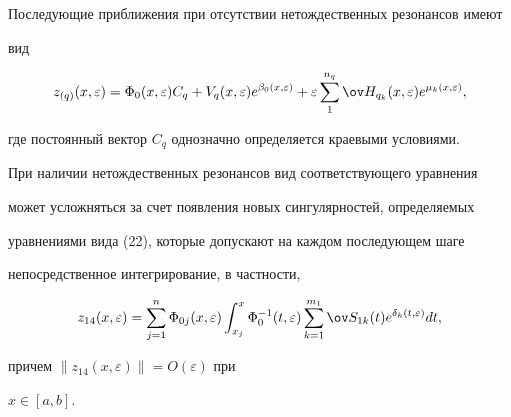 Последующие приближения при отсутствии нетождественных резонансов имеют 


вид 


$$ 


z_{(q)}(x,\varepsilon)=\Phi_0(x,\varepsilon)C_q+ 


V_q(x,\varepsilon)e^{\beta_0(x,\varepsilon)}+\varepsilon 


\sum^{n_q}_1 \ov H_{q_k}(x,\varepsilon) 


e^{\mu_k(x,\varepsilon)}, 


$$ 


где постоянный вектор $C_q$ однозначно определяется краевыми условиями. 


При наличии нетождественных резонансов вид соответствующего уравнения 


может усложняться за счет появления новых сингулярностей, определяемых 


уравнениями вида (22), которые допускают на каждом последующем шаге 


непосредственное интегрирование, в частности, 


$$ 


z_{14}


(x,\varepsilon)=\sum^n_{j=1}\Phi_{0j}(x,\varepsilon) 


\int^x_{x_j}\Phi^{-1}_0(t,\varepsilon) 


\sum^{m_1}_{k=1}\ov S_{1k}(t)e^{\delta_k(t,\varepsilon)}dt, 


$$ 


причем $\|z_{14}(x,\varepsilon)\|=O(\varepsilon)$ при 


$x\in[a,b]$. 


 


 


